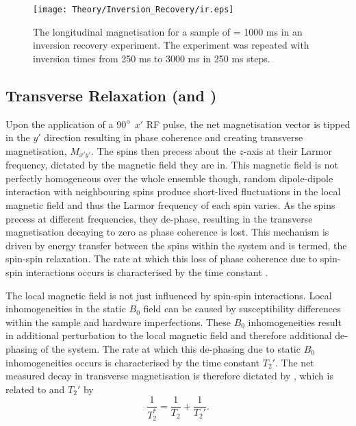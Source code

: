 \begin{figure}[H]
	\centering
	\texttt{[image: Theory/Inversion\_Recovery/ir.eps]}
	\caption{The longitudinal magnetisation for a sample of \tone = 1000 ms in an inversion recovery experiment. The experiment was repeated with inversion times from 250 ms to 3000 ms in 250 ms steps.}
	\label{fig:theory_inversion_recovery}	
\end{figure}

\subsection{Transverse Relaxation (\ttwo and \ttwostar)}
\label{subsec:theory_t2}
Upon the application of a 90$\degree$ $x'$ \ac{RF} pulse, the net magnetisation vector is tipped in the $y'$ direction resulting in phase coherence and creating transverse magnetisation, $M_{x'y'}$. The spins then precess about the $z$-axis at their Larmor frequency, dictated by the magnetic field they are in. This magnetic field is not perfectly homogeneous over the whole ensemble though, random dipole-dipole interaction with neighbouring spins produce short-lived fluctuations in the local magnetic field and thus the Larmor frequency of each spin varies. As the spins precess at different frequencies, they de-phase, resulting in the transverse magnetisation decaying to zero as phase coherence is lost. This mechanism is driven by energy transfer between the spins within the system and is termed, the spin-spin relaxation. The rate at which this loss of phase coherence due to spin-spin interactions occurs is characterised by the time constant \ttwo.

\newpage
The local magnetic field is not just influenced by spin-spin interactions. Local inhomogeneities in the static $B_0$ field can be caused by susceptibility differences within the sample and hardware imperfections. These $B_0$  inhomogeneities result in additional perturbation to the local magnetic field and therefore additional de-phasing of the system. The rate at which this de-phasing due to static $B_0$ inhomogeneities occurs is characterised by the time constant $T_2'$. The net measured decay in transverse magnetisation is therefore dictated by \ttwostar, which is related to \ttwo and $T_2'$ by
\begin{equation}
\frac{1}{T_2^*} = \frac{1}{T_2} + \frac{1}{T_2'}.
\end{equation}
